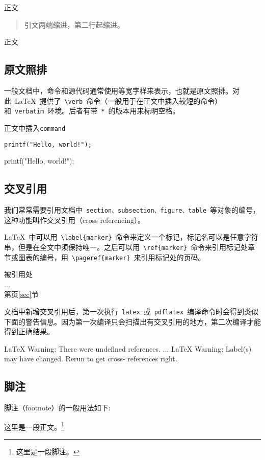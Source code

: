 \begin{demo}
正文
\begin{verse}
引文两端缩进，第二行起缩进。
\end{verse}
正文
\end{demo}

\subsection{原文照排}
一般文档中，命令和源代码通常使用等宽字样来表示，也就是原文照排。对此~\LaTeX~提供了~\verb|\verb|~命令（一般用于在正文中插入较短的命令）和~\verb|verbatim|~环境。后者有带~\verb|*|~的版本用来标明空格。

\begin{demo}
正文中插入\verb|command|
\begin{verbatim}
printf("Hello, world!");
\end{verbatim}
\begin{verbatim*}
printf("Hello, world!");
\end{verbatim*}
\end{demo}

\subsection{交叉引用}
我们常常需要引用文档中~\verb|section、subsection、figure、table|~等对象的编号，这种功能叫作交叉引用（cross referencing）。

\LaTeX~中可以用~\verb|\label{marker}|~命令来定义一个标记，标记名可以是任意字符串，但是在全文中须保持唯一。之后可以用~\verb|\ref{marker}|~命令来引用标记处章节或图表的编号，用~\verb|\pageref{marker}|~来引用标记处的页码。

\begin{demo}
被引用处\label{sec}\\
...\\
第\pageref{sec}页\ref{sec}节
\end{demo}

文档中新增交叉引用后，第一次执行~\verb|latex|~或~\verb|pdflatex|~编译命令时会得到类似下面的警告信息。因为第一次编译只会扫描出有交叉引用的地方，第二次编译才能得到正确结果。

\begin{code}
LaTeX Warning: There were undefined references.
...
LaTeX Warning: Label(s) may have changed. Rerun to get cross-
references right.
\end{code}

\subsection{脚注}
脚注（footnote）的一般用法如下:
\begin{demo}
这里是一段正文。\footnote{这里是一段脚注。}
\end{demo}

